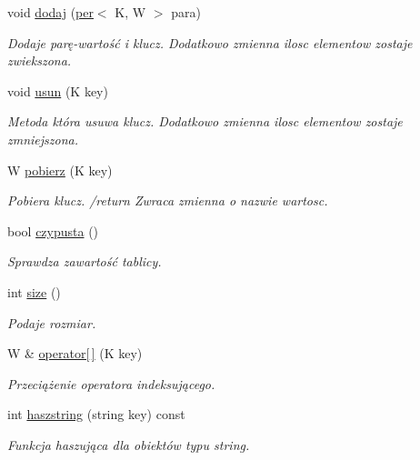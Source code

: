 \begin{DoxyCompactItemize}
\item 
void \hyperlink{class_tablicaas_ac97f4cb96d75a56448b9ed5a44b60826}{dodaj} (\hyperlink{classper}{per}$<$ K, W $>$ para)
\begin{DoxyCompactList}\small\item\em Dodaje parę-\/wartość i klucz. Dodatkowo zmienna ilosc elementow zostaje zwiekszona. \end{DoxyCompactList}\item 
void \hyperlink{class_tablicaas_aa961a5575d84d6f5762063f719879ae1}{usun} (K key)
\begin{DoxyCompactList}\small\item\em Metoda która usuwa klucz. Dodatkowo zmienna ilosc elementow zostaje zmniejszona. \end{DoxyCompactList}\item 
W \hyperlink{class_tablicaas_a329ae3086855ea056a5249430de4b5f3}{pobierz} (K key)
\begin{DoxyCompactList}\small\item\em Pobiera klucz. /return Zwraca zmienna o nazwie wartosc. \end{DoxyCompactList}\item 
bool \hyperlink{class_tablicaas_aff9f43c59bcb48c6f8fee095517960c9}{czypusta} ()
\begin{DoxyCompactList}\small\item\em Sprawdza zawartość tablicy. \end{DoxyCompactList}\item 
int \hyperlink{class_tablicaas_a2a6376d5554f6e028baf1c64f182fedc}{size} ()
\begin{DoxyCompactList}\small\item\em Podaje rozmiar. \end{DoxyCompactList}\item 
W \& \hyperlink{class_tablicaas_aacc5f2336e38656f946e46076794a071}{operator\mbox{[}$\,$\mbox{]}} (K key)
\begin{DoxyCompactList}\small\item\em Przeciążenie operatora indeksującego. \end{DoxyCompactList}\item 
int \hyperlink{class_tablicaas_a40a1e67d84970aaf04581fd6e0346220}{haszstring} (string key) const 
\begin{DoxyCompactList}\small\item\em Funkcja haszująca dla obiektów typu string. \end{DoxyCompactList}\end{DoxyCompactItemize}
